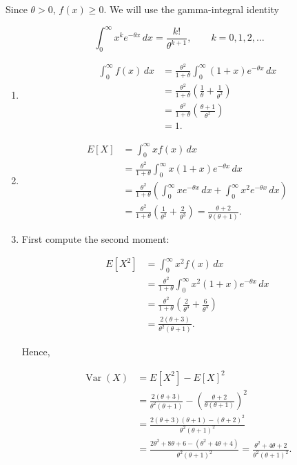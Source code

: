 \documentclass[11pt]{article}
\newenvironment{solution}{
    \par
    \begin{tcolorbox}[
        colback=white,
        colframe=uwgold,
        boxrule=0.7pt,
        arc=2mm,
        left=3mm,
        right=3mm,
        top=2mm,
        bottom=2mm,
        breakable,
        before skip=0.5em,
        after skip=1em,
        title=\textbf{Solution},
        coltitle=uwpurple,
        fonttitle=\bfseries
    ]
}{
    \end{tcolorbox}
}
\begin{document}
\begin{solution}

Since \(\theta>0\), $f(x)\geq0.$ We will use the gamma-integral identity

\[
\int_0^\infty x^k e^{-\theta x}\,dx
=
\frac{k!}{\theta^{k+1}},
\qquad k=0,1,2,\ldots
\]

\begin{enumerate}[label=(\alph*)]

\item

\begin{align*}
\int_0^\infty f(x)\,dx
&=
\frac{\theta^2}{1+\theta}
\int_0^\infty(1+x)e^{-\theta x}\,dx\\
&=
\frac{\theta^2}{1+\theta}
\left(
\frac1\theta+\frac1{\theta^2}
\right)\\
&=
\frac{\theta^2}{1+\theta}
\left(
\frac{\theta+1}{\theta^2}
\right)\\
&=
1.
\end{align*}

\item

\begin{align*}
E[X]
&=
\int_0^\infty x f(x)\,dx\\
&=
\frac{\theta^2}{1+\theta}
\int_0^\infty x(1+x)e^{-\theta x}\,dx\\
&=
\frac{\theta^2}{1+\theta}
\left(
\int_0^\infty xe^{-\theta x}\,dx
+
\int_0^\infty x^2e^{-\theta x}\,dx
\right)\\
&=
\frac{\theta^2}{1+\theta}
\left(
\frac1{\theta^2}
+
\frac2{\theta^3}
\right) =  {
\frac{\theta+2}{\theta(\theta+1)}
}.
\end{align*}

\item First compute the second moment:

\begin{align*}
E[X^2]
&=
\int_0^\infty x^2f(x)\,dx\\
&=
\frac{\theta^2}{1+\theta}
\int_0^\infty x^2(1+x)e^{-\theta x}\,dx\\
&=
\frac{\theta^2}{1+\theta}
\left(
\frac2{\theta^3}
+
\frac6{\theta^4}
\right)\\
&=
\frac{2(\theta+3)}
{\theta^2(\theta+1)}.
\end{align*}

Hence,

\begin{align*}
\operatorname{Var}(X)
&=
E[X^2]-E[X]^2\\
&=
\frac{2(\theta+3)}
{\theta^2(\theta+1)}
-
\left(
\frac{\theta+2}
{\theta(\theta+1)}
\right)^2\\
&=
\frac{
2(\theta+3)(\theta+1)-(\theta+2)^2
}
{\theta^2(\theta+1)^2}\\
&=
\frac{
2\theta^2+8\theta+6
-
(\theta^2+4\theta+4)
}
{\theta^2(\theta+1)^2} =  {
\frac{\theta^2+4\theta+2}
{\theta^2(\theta+1)^2}
}.
\end{align*}

\end{enumerate}

\end{solution}
\end{document}
